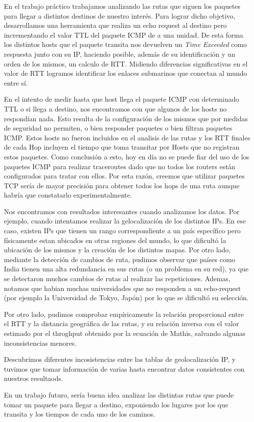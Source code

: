En el trabajo práctico trabajamos analizando las rutas que siguen los paquetes para llegar a distintos destinos de nuestro interés. Para lograr dicho objetivo, desarrollamos una herramienta que realiza un echo request al destino pero incrementando el valor TTL del paquete ICMP de a una unidad. De esta forma los distintos hosts que el paquete transita nos devuelven un \textit{Time Exceeded} como respuesta junto con su IP, haciendo posible, además de su identificación y un orden de los mismos, un calculo de RTT. Midiendo diferencias significativas en el valor de RTT logramos identificar los enlaces submarinos que conectan al mundo entre sí.

En el intento de medir hasta que host llega el paquete ICMP con determinado TTL o si llega a destino, nos encontramos con que algunos de los hosts no respondían nada. Esto resulta de la configuración de los mismos que por medidas de seguridad no permiten, o bien responder paquetes o bien filtran paquetes ICMP. Estos hosts no fueron incluidos en el analisis de las rutas y los RTT finales de cada Hop incluyen el tiempo que toma transitar por Hosts que no registran estos paquetes. Como conclusión a esto, hoy en día no se puede fiar del uso de los paquetes ICMP para realizar traceroutes dado que no todos los routers están configurados para tratar con ellos. Por esta razón, creemos que utilizar paquetes TCP sería de mayor precisión para obtener todos los hops de una ruta aunque habría que constatarlo experimentalmente.

Nos encontramos con resultados interesantes cuando analizamos los datos. Por ejemplo, cuando intentamos realizar la gelocalización de los distintos IPs. En ese caso, existen IPs que tienen un rango correspondiente a un país específico pero físicamente estan ubicados en otras regiones del mundo, lo que dificultó la ubicación de los mismos y la creación de los distintos mapas. Por otro lado, mediante la detección de cambios de ruta, pudimos observar que países como India tienen una alta redundancia en sus rutas (o un problema en su red), ya que se detectaron muchos cambios de rutas al realizar las repeticiones. Ademas, notamos que habian muchas universidades que no responden a un echo-request (por ejemplo la Universidad de Tokyo, Japón) por lo que se dificultó su selección.

Por otro lado, pudimos comprobar empíricamente la relación proporcional entre el RTT y la distancia geográfica de las rutas, y su relación inversa con el valor estimado por el throghput obtenido por la ecuación de Mathis, salvando algunas inconsistencias menores.

Descubrimos diferentes incosistencias entre las tablas de geolocalización IP, y tuvimos que tomar información de varias hasta encontrar datos consistentes con nuestros resultaods.

En un trabajo futuro, sería buena idea analizar las distintas rutas que puede tomar un paquete para llegar a destino, exponiendo los lugares por los que transita y los tiempos de cada uno de los caminos.